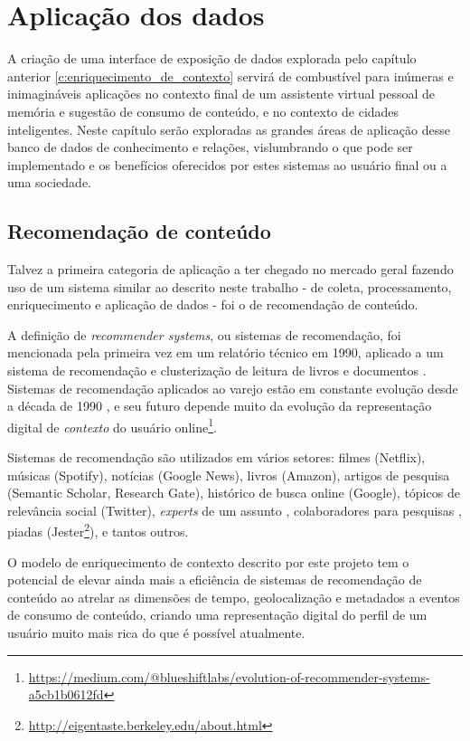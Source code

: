 \chapter{Aplicação dos dados}

A criação de uma interface de exposição de dados explorada pelo capítulo anterior \ref{c:enriquecimento_de_contexto} servirá de combustível para inúmeras e inimagináveis aplicações no contexto final de um assistente virtual pessoal de memória e sugestão de consumo de conteúdo, e no contexto de cidades inteligentes. Neste capítulo serão exploradas as grandes áreas de aplicação desse banco de dados de conhecimento e relações, vislumbrando o que pode ser implementado e os benefícios oferecidos por estes sistemas ao usuário final ou a uma sociedade.

\section{Recomendação de conteúdo}

Talvez a primeira categoria de aplicação a ter chegado no mercado geral fazendo uso de um sistema similar ao descrito neste trabalho - de coleta, processamento, enriquecimento e aplicação de dados - foi o de recomendação de conteúdo.

A definição de \textit{recommender systems}, ou sistemas de recomendação, foi mencionada pela primeira vez em um relatório técnico em 1990, aplicado a um sistema de recomendação e clusterização de leitura de livros e documentos \cite{Karlgren931533}. Sistemas de recomendação aplicados ao varejo estão em constante evolução desde a década de 1990 \cite{twodecades:amazon}, e seu futuro depende muito da evolução da representação digital de \textit{contexto} do usuário online\footnote{\url{https://medium.com/@blueshiftlabs/evolution-of-recommender-systems-a5cb1b0612fd}}.

Sistemas de recomendação são utilizados em vários setores: filmes (Netflix), músicas (Spotify), notícias (Google News), livros (Amazon), artigos de pesquisa (Semantic Scholar, Research Gate), histórico de busca online (Google), tópicos de relevância social (Twitter), \textit{experts} de um assunto \cite{expertseer}, colaboradores para pesquisas \cite{collabseer}, piadas (Jester\footnote{\url{http://eigentaste.berkeley.edu/about.html}}), e tantos outros.

O modelo de enriquecimento de contexto descrito por este projeto tem o potencial de elevar ainda mais a eficiência de sistemas de recomendação de conteúdo ao atrelar as dimensões de tempo, geolocalização e metadados a eventos de consumo de conteúdo, criando uma representação digital do perfil de um usuário muito mais rica do que é possível atualmente.

